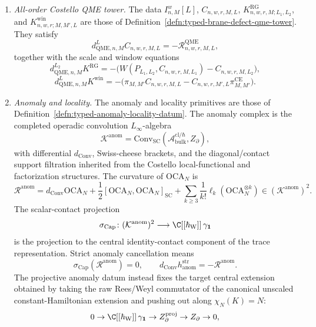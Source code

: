 \begin{defn}
\begin{enumerate}[label=\textup{(D\arabic*)}]
  \item \emph{All-order Costello QME tower.}
    The data
    \(I^w_{n,M}[L]\), \(C_{n,w,r,M,L}\),
    \(K^{\mathrm{RG}}_{n,w,r,M;L_1,L_2}\), and
    \(K^{\mathrm{win}}_{n,w,r;M,M',L}\) are those of
    Definition~\ref{defn:typed-brane-defect-qme-tower}.  They satisfy
    \[
      d^{L}_{\mathrm{QME},n,M}C_{n,w,r,M,L}
      =
      -\mathcal R^{\mathrm{QME}}_{n,w,r,M,L},
    \]
    together with the scale and window equations
    \[
      d^{L_2}_{\mathrm{QME},n,M}K^{\mathrm{RG}}
      =-\bigl(W(P_{L_1,L_2},C_{n,w,r,M,L_1})
        -C_{n,w,r,M,L_2}\bigr),
    \]
    \[
      d^{L}_{\mathrm{QME},n,M}K^{\mathrm{win}}
      =-\bigl(\pi_{M,M'}C_{n,w,r,M,L}
        -C_{n,w,r,M',L}\pi^{\mathrm{CE}}_{M,M'}\bigr).
    \]

  \item \emph{Anomaly and locality.}
    The anomaly and locality primitives are those of
    Definition~\ref{defn:typed-anomaly-locality-datum}.  The anomaly
    complex is the completed operadic convolution \(L_\infty\)-algebra
    \[
      \mathcal K^{\mathrm{anom}}
      =
      \mathrm{Conv}_{\mathrm{SC}}\!\left(
      \mathcal A^{\mathrm{cl}/\hbar}_{\mathrm{bulk}},
      Z_\partial\right),
    \]
    with differential \(d_{\mathrm{Conv}}\), Swiss-cheese brackets, and
    the diagonal/contact support filtration inherited from the
    Costello local-functional and factorization structures.  The
    curvature of \(\mathrm{OCA}_N\) is
    \[
      \mathcal R^{\mathrm{anom}}
      =
      d_{\mathrm{Conv}}\mathrm{OCA}_N
      +\frac12[\mathrm{OCA}_N,\mathrm{OCA}_N]_{\mathrm{SC}}
      +\sum_{k\ge3}\frac1{k!}\ell_k(\mathrm{OCA}_N^{\otimes k})
      \in(\mathcal K^{\mathrm{anom}})^2 .
    \]
    The scalar-contact projection
    \[
      \sigma_{\mathrm{Cap}}\colon
      (\mathcal K^{\mathrm{anom}})^2
      \longrightarrow
      \C[[\hbar_{\mathrm{W}}]]\,\gamma_{\mathbf1}
    \]
    is the projection to the central identity-contact component of the
    trace representation.  Strict anomaly cancellation means
    \[
      \sigma_{\mathrm{Cap}}(\mathcal R^{\mathrm{anom}})=0,\qquad
      d_{\mathrm{Conv}}h^{\mathrm{str}}_{\mathrm{anom}}
      =
      -\mathcal R^{\mathrm{anom}}.
    \]
    The projective anomaly datum instead fixes the target central
    extension obtained by taking the raw Rees/Weyl commutator of the
    canonical unscaled constant-Hamiltonian extension and pushing out
    along \(\chi_N(K)=N\):
    \[
      0\to \C[[\hbar_{\mathrm{W}}]]\,\gamma_{\mathbf1}
      \to Z_\partial^{\mathrm{proj}}
      \to Z_\partial\to0,
\]
\end{enumerate}
\end{defn}
